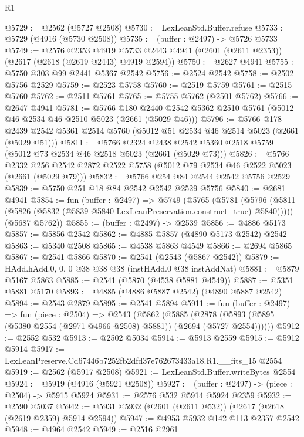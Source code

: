 \begin{lexlean}{R1}
\begin{coremodule}
@5729 := @2562 (@5727 @2508)
@5730 := LexLeanStd.Buffer.refuse
@5733 := @5729 (@4916 (@5730 @2508))
@5735 := (buffer : @2497) -> @5726 @5733
@5749 := @2576
    @2353
    @4919
    @5733
    @2443
    @4941
    (@2601 (@2611 @2353))
    (@2617 (@2618 (@2619 @2443) @4919 @2594))
@5750 := @2627 @4941
@5755 := @5750 @303 @99 @2441 @5367 @2542
@5756 := @2524 @2542
@5758 := @2502 @5756 @2529
@5759 := @2523 @5758
@5760 := @2519 @5759
@5761 := @2515 @5760
@5762 := @2511 @5761
@5765 := @5755 @5762 (@2501 @5762)
@5766 := @2647 @4941
@5781 := @5766
    @180
    @2440
    @2542
    @5362
    @2510
    @5761
    (@5012 @46 @2534 @46 @2510 @5023 (@2661 (@5029 @46)))
@5796 := @5766
    @178
    @2439
    @2542
    @5361
    @2514
    @5760
    (@5012 @51 @2534 @46 @2514 @5023 (@2661 (@5029 @51)))
@5811 := @5766
    @2324
    @2438
    @2542
    @5360
    @2518
    @5759
    (@5012 @73 @2534 @46 @2518 @5023 (@2661 (@5029 @73)))
@5826 := @5766
    @2332
    @256
    @2542
    @2872
    @2522
    @5758
    (@5012 @79 @2534 @46 @2522 @5023 (@2661 (@5029 @79)))
@5832 := @5766 @254 @84 @2544 @2542 @5756 @2529
@5839 := @5750 @251 @18 @84 @2542 @2542 @2529 @5756
@5840 := @2681 @4941
@5854 := fun (buffer : @2497) =>
  @5749
    (@5765
      (@5781 (@5796 (@5811 (@5826 (@5832 (@5839 @5840 LexLeanPreservation.construct_true) @5840)))))
      (@5687 @5762))
@5855 := (buffer : @2497) -> @2539
@5856 := @4886 @5173
@5857 := @5856 @2542
@5862 := @4885 @5857 (@4890 @5173 @2542) @2542
@5863 := @5340 @2508
@5865 := @4538 @5863 @4549
@5866 := @2694 @5865
@5867 := @2541 @5866
@5870 := @2541 (@2543 (@5867 @2542))
@5879 := HAdd.hAdd.{0, 0, 0} @38 @38 @38 (instHAdd.{0} @38 instAddNat)
@5881 := @5879 @5167 @5863
@5885 := @2541 (@5870 (@4538 @5881 @4549))
@5887 := @5351 @5881 @5170
@5893 := @4885 (@4886 @5887 @2542) (@4890 @5887 @2542)
@5894 := @2543 @2879
@5895 := @2541 @5894
@5911 := fun (buffer : @2497) =>
  fun (piece : @2504) =>
  @2543
    (@5862
      (@5885 (@2878 (@5893 (@5895 (@5380 @2554 (@2971 @4966 @2508) @5881)) (@2694 (@5727 @2554))))))
@5912 := @2552 @532
@5913 := @2502 @5034
@5914 := @5913 @2559
@5915 := @5912 @5914
@5917 := LexLeanPreserve.Cd67446b7252fb2dfd37e762673433a18.R1.__fits_15 @2554
@5919 := @2562 (@5917 @2508)
@5921 := LexLeanStd.Buffer.writeBytes @2554
@5924 := @5919 (@4916 (@5921 @2508))
@5927 := (buffer : @2497) -> (piece : @2504) -> @5915 @5924
@5931 := @2576 @532 @5914 @5924 @2359
@5932 := @2590 @5037
@5942 := @5931 @5932 (@2601 (@2611 @532)) (@2617 (@2618 (@2619 @2359) @5914 @2594))
@5947 := @4953 @5932 @142 @113 @2357 @2542
@5948 := @4964 @2542
@5949 := @2516 @2961

\end{coremodule}
\end{lexlean}
